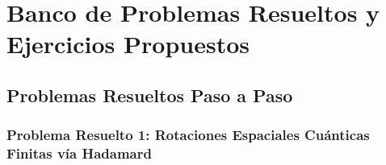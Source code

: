 
\section{Banco de Problemas Resueltos y Ejercicios Propuestos}
\label{sec:ejercicios}

\subsection{Problemas Resueltos Paso a Paso}

\subsubsection[Problema 1: Rotaciones finitas vía Hadamard]{Problema Resuelto 1: Rotaciones Espaciales Cuánticas Finitas vía Hadamard}
